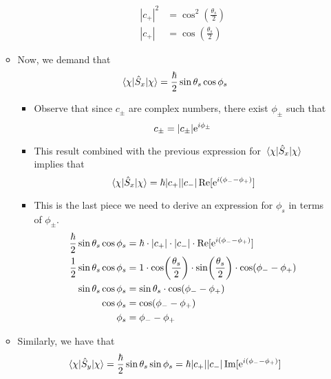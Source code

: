 \documentclass[../notes.tex]{subfiles}
\begin{document}
\begin{itemize}
\begin{itemize}
\begin{itemize}
\begin{align*}
                |c_+|^2 &= \cos^2\left( \frac{\theta_s}{2} \right)\\
                |c_+| &= \cos(\frac{\theta_s}{2})
            \end{align*}
        \end{itemize}
        \item Now, we demand that
        \begin{equation*}
            \ev{\hat{S}_x}{\chi} = \frac{\hbar}{2}\sin\theta_s\cos\phi_s
        \end{equation*}
        \begin{itemize}
            \item Observe that since $c_\pm$ are complex numbers, there exist $\phi_\pm$ such that
            \begin{equation*}
                c_\pm = |c_\pm|\e[i\phi_\pm]
            \end{equation*}
            \item This result combined with the previous expression for $\ev{\hat{S}_x}{\chi}$ implies that
            \begin{equation*}
                \ev{\hat{S}_x}{\chi} = \hbar|c_+||c_-|\re[\e[i(\phi_--\phi_+)]]
            \end{equation*}
            \item This is the last piece we need to derive an expression for $\phi_s$ in terms of $\phi_\pm$.
            \begin{align*}
                \frac{\hbar}{2}\sin\theta_s\cos\phi_s &= \hbar\cdot|c_+|\cdot|c_-|\cdot\re[\e[i(\phi_--\phi_+)]]\\
                \frac{1}{2}\sin\theta_s\cos\phi_s &= 1\cdot\cos(\frac{\theta_s}{2})\cdot\sin(\frac{\theta_s}{2})\cdot\cos(\phi_--\phi_+)\\
                \sin\theta_s\cos\phi_s &= \sin\theta_s\cdot\cos(\phi_--\phi_+)\\
                \cos\phi_s &= \cos(\phi_--\phi_+)\\
                \phi_s &= \phi_--\phi_+
            \end{align*}
        \end{itemize}
        \item Similarly, we have that
        \begin{equation*}
            \ev{\hat{S}_y}{\chi} = \frac{\hbar}{2}\sin\theta_s\sin\phi_s
            = \hbar|c_+||c_-|\im[\e[i(\phi_--\phi_+)]]
        \end{equation*}
        \begin{itemize}

\end{itemize}
\end{itemize}
\end{itemize}
\end{document}
